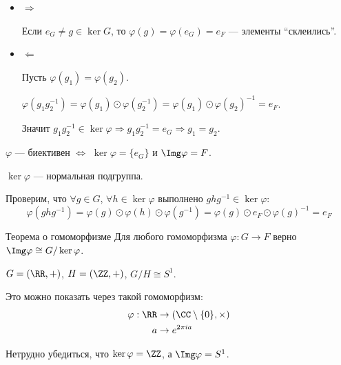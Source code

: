 \begin{itemize}
    \item
        \( \Rightarrow \)

        Если \( e_G \neq g \in \ker G \), то \( \varphi(g) = \varphi(e_G) = e_F \) --- элементы ``склеились''.
    \item
        \( \Leftarrow \)

        Пусть \( \varphi(g_1) = \varphi(g_2) \).

        \( \varphi(g_1 g_2^{-1}) = \varphi(g_1) \odot \varphi(g_2^{-1}) = \varphi(g_1) \odot \varphi(g_2)^{-1} = e_F \).

        Значит \( g_1 g_2^{-1} \in \ker \varphi \Rightarrow g_1 g_2^{-1} = e_G \Rightarrow g_1 = g_2 \).
\end{itemize}

\begin{coroll}{}{}
    \( \varphi \) --- биективен \( \Leftrightarrow \) \( \ker \varphi = \{ e_G \} \) и \( \Img \varphi = F \).
\end{coroll}

\begin{prop}{}{}
    \( \ker \varphi \) --- нормальная подгруппа.
\end{prop}

Проверим, что \( \forall g \in G \), \( \forall h \in \ker \varphi \) выполнено \( g h g^{-1} \in \ker \varphi \):
\[
    \varphi(g h g^{-1})
    =
    \varphi(g) \odot \varphi(h) \odot \varphi(g^{-1})
    =
    \varphi(g) \odot e_F \odot \varphi(g)^{-1}
    =
    e_F
\]

\begin{thrm}{Теорема о гомоморфизме}{}
    Для любого гомоморфизма \( \varphi : G \to F \) верно \( \Img \varphi \cong G / \ker \varphi \).
\end{thrm}

\begin{example}{}{}
    \( G = (\RR, +) \), \( H = (\ZZ, +) \), \( G / H \cong S^1 \).

    Это можно показать через такой гомоморфизм:
    \[
        \begin{aligned}
            \varphi : \RR &\to (\CC \setminus \{ 0 \}, \times)
            \\
            a &\to e^{2 \pi i a}
        \end{aligned}
    \]

    Нетрудно убедиться, что \( \ker \varphi = \ZZ \), а \( \Img \varphi = S^1 \).
\end{example}

